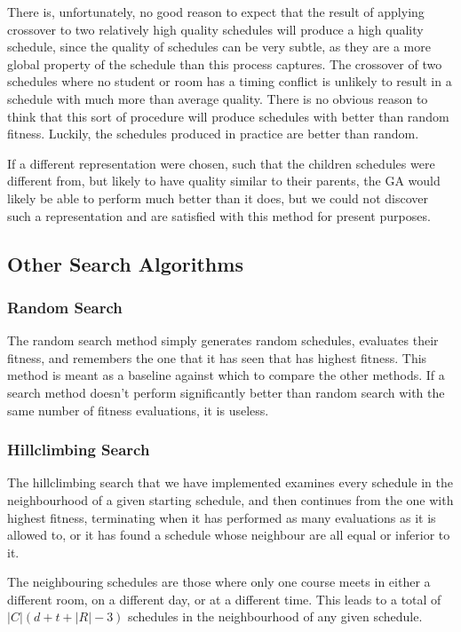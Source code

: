 \documentclass[letterpaper]{article}
\begin{document}
      There is, unfortunately, no good reason to expect that the result of applying 
      crossover to two relatively high quality schedules will produce a high quality 
      schedule, since the quality of schedules can be very subtle, as they are a more 
      global property of the schedule than this process captures. The crossover of two 
      schedules where no student or room has a timing conflict is unlikely to result in 
      a schedule with much more than average quality. There is no obvious reason to think 
      that this sort of procedure will produce schedules with better than random fitness. 
      Luckily, the schedules produced in practice are better than random.
      
      If a different representation were chosen, such that the children schedules were
      different from, but likely to have quality similar to their parents, the GA would 
      likely be able to perform much better than it does, but we could not discover such a
      representation and are satisfied with this method for present purposes.
      
  \subsection{Other Search Algorithms}
    \subsubsection{Random Search}
      The random search method simply generates random schedules, evaluates their fitness,
      and remembers the one that it has seen that has highest fitness. This method is meant
      as a baseline against which to compare the other methods. If a search method doesn't
      perform significantly better than random search with the same number of fitness
      evaluations, it is useless.
      
    \subsubsection{Hillclimbing Search}
      The hillclimbing search that we have implemented examines every schedule in the
      neighbourhood of a given starting schedule, and then continues from the one with
      highest fitness, terminating when it has performed as many evaluations as it is allowed
      to, or it has found a schedule whose neighbour are all equal or inferior to it.
      
      The neighbouring schedules are those where only one course meets in either a different
      room, on a different day, or at a different time. 
      This leads to a total of $ |C|(d+t+|R|-3) $ schedules in the neighbourhood of any given schedule.
\end{document}
